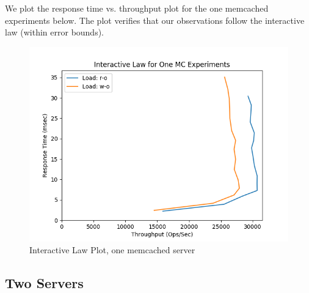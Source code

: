 \documentclass[11pt,a4paper]{article}
\newcommand\instructions[1]{\textcolor{blue}{Instructions: #1}}
\newcommand\todo[1]{\textcolor{red}{TODO: #1}}
\begin{document}
We plot the response time vs. throughput plot for the one memcached experiments below. The plot verifies that our observations follow the interactive law (within error bounds).
\begin{figure}[H]
	\captionsetup{font=scriptsize,labelfont=scriptsize,justification=centering}
	\centering
		\includegraphics[scale=0.7]{images/2a_interactive_law.png}
		\caption{Interactive Law Plot, one memcached server}
\end{figure}




\subsection{Two Servers}

\end{document}

